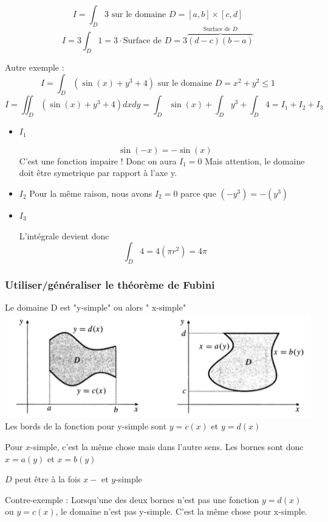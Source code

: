 \[I=\int_D 3 \text{  sur le domaine }D=[a,b]\times[c,d]\]
\[I=3\int_D 1 = 3 \cdot \text{Surface de }D = 3\overbrace{(d-c)(b-a)}^{\text{Surface de }D} \]

Autre exemple :
\[I = \int_D ( \sin(x) +y^3 + 4 )\text{ sur le domaine } D=x^2+y^2\le 1\]
\[I = \iint_D(\sin(x)+y^3+4)dxdy = \int_D \sin(x) + \int_D y^3 + \int_D 4 = I_1 + I_2 + I_3\]
\begin{itemize}

\item \textbf{$I_1$}




\[\sin(-x) = -\sin(x) \]
C'est une fonction impaire !
Donc on aura \emph{$I_1=0$}
Mais attention, le domaine doit être symetrique par rapport à l'axe y.
\item \textbf{$I_2$}
Pour la même raison, nous avons $I_2=0$ parce que $(-y^3) = -(y^3)$

\item \textbf{$I_3$}

L'intégrale devient donc
\[\int_D 4 = 4(\pi r^2) = 4\pi \]

\end{itemize}
\subsubsection{Utiliser/généraliser le théorème de Fubini}

Le domaine D est "y-simple" ou alors " x-simple"\\
\includegraphics[scale=0.7]{image2.png}
\\
Les bords de la fonction pour y-simple sont $y=c(x)$ et $y=d(x)$

Pour $x$-simple, c'est la même chose mais dans l'autre sens. Les bornes sont donc $x=a(y)$ et $x=b(y)$
\begin{myrem}
$D$ peut être à la fois $x-$ et $y$-simple
\end{myrem}
\begin{myrem}
Contre-exemple : Lorsqu'une des deux bornes n'est pas une fonction $y=d(x)$ ou $y=c(x)$, le domaine n'est pas y-simple. C'est la même chose pour x-simple.

\end{myrem}

